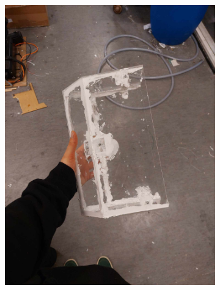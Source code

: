 \begin{figure}[H]
    \centering
    \begin{subfigure}[b]{0.4\textwidth}
        \centering
        \includegraphics[width=\textwidth]{box_silicon_1.jpg}
    \end{subfigure}
    \begin{subfigure}[b]{0.4\textwidth}
        \centering

\end{subfigure}
\end{figure}

